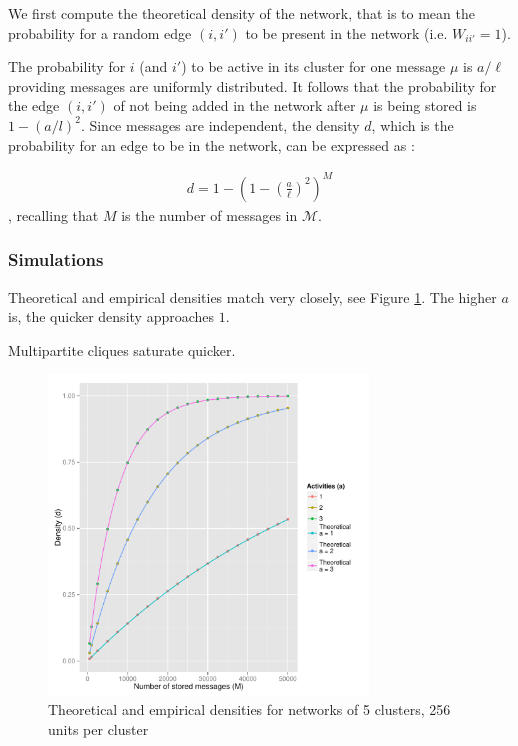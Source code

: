\documentclass[english,10pt,twocolumn]{IEEEtran}
\theoremstyle{definition}
\begin{document}
	We first compute the theoretical density of the network, that is to mean the probability for a random edge $(i, i')$ to be present in the network (i.e. $W_{ii'} = 1$). 
	
	
	
	
	
	
	
	
	

	
	
	The probability for $i$ (and $i'$) to be active in its cluster for one message $\mu$ is $a/\ell$ providing messages are uniformly distributed. It follows that the probability for the edge $(i,i')$ of not being added in the network after $\mu$ is being stored is $1 - \left(a/l\right)^2$. Since messages are independent, the density $d$, which is the probability for an edge to be in the network, can be expressed as :
	
	\begin{align}
		\label{formula_density}
		d = 1 - \left( 1 - \left(\frac{a}{\ell}\right)^2 \right)^M 
	\end{align}		
	, recalling that $M$ is the number of messages in $\mathcal{M}$.	
	
	\subsubsection{Simulations}
	
	Theoretical and empirical densities match very closely, see Figure \ref{densiteth}. %
	The higher $a$ is, the quicker density approaches $1$.
	
	Multipartite cliques saturate quicker.
	
	\begin{figure}[!htb]
		\includegraphics[width=8.5cm]{Courbes/c5l256densities}%
		\caption{Theoretical and empirical densities for networks of 5 clusters, 256 units per cluster }
			\label{densiteth}
	\end{figure}	
	
\end{document}

